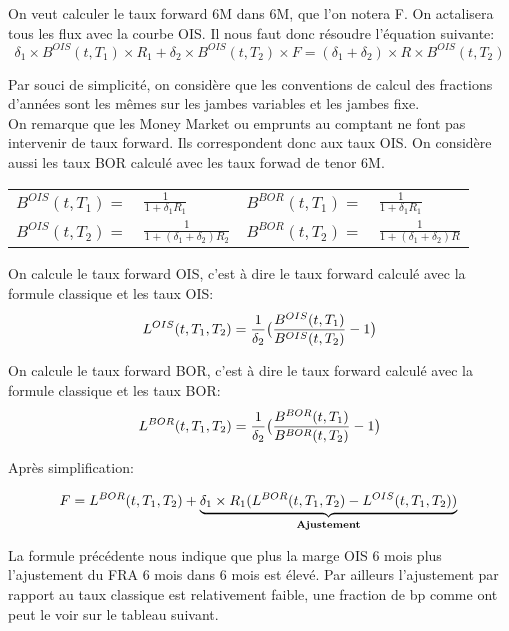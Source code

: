 \documentclass{article}
\begin{document}
On veut calculer le taux forward 6M dans 6M, que l'on notera F. On actalisera tous les flux avec la courbe OIS. Il nous faut donc résoudre l'équation suivante:\\
\[
\delta_1 \times B^{OIS}(t,T_1) \times R_1 + \delta_2 \times B^{OIS}(t,T_2) \times F = (\delta_1 + \delta_2) \times R \times B^{OIS}(t,T_2)
\]

Par souci de simplicité, on considère que les conventions de calcul des fractions d'années sont les mêmes sur les jambes variables et les jambes fixe.\\

On remarque que les Money Market ou emprunts au comptant ne font pas intervenir de taux forward. Ils correspondent donc aux taux OIS. On considère aussi les taux BOR calculé avec les taux forwad de tenor 6M.

\begin{center}
\begin{tabular}{r l r l}
$B^{OIS}(t,T_1)=$ & $\frac{1}{1+\delta_1 R_1}$ & $B^{BOR}(t,T_1)=$ & $\frac{1}{1+\delta_1 R_1}$ \\
$B^{OIS}(t,T_2)=$ & $\frac{1}{1+(\delta_1 + \delta_2) R_2}$ & $B^{BOR}(t,T_2)=$ & $\frac{1}{1+(\delta_1 + \delta_2) R}$ \\
\end{tabular}
\end{center}

On calcule le taux forward OIS, c'est à dire le taux forward calculé avec la formule classique et les taux OIS:\\

\[
L^{OIS}(t,T_1,T_2)=\frac{1}{\delta_2}\big(\frac{B^{OIS}(t,T_1)}{B^{OIS}(t,T_2)}-1\big)\\
\]

On calcule le taux forward BOR, c'est à dire le taux forward calculé avec la formule classique et les taux BOR:\\

\[
L^{BOR}(t,T_1,T_2)=\frac{1}{\delta_2}\big(\frac{B^{BOR}(t,T_1)}{B^{BOR}(t,T_2)}-1\big)\\
\]

Après simplification:

\[
F=L^{BOR}(t,T_1,T_2)+\underbrace{\delta_1 \times R_1 (L^{BOR}(t,T_1,T_2)-L^{OIS}(t,T_1,T_2))}_{\textbf{Ajustement}} \\
\]

La formule précédente nous indique que plus la marge OIS 6 mois plus l'ajustement du FRA 6 mois dans 6 mois est élevé. Par ailleurs l'ajustement par rapport au taux classique est relativement faible, une fraction de bp comme ont peut le voir sur le tableau suivant.
\end{document}
